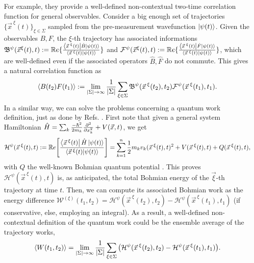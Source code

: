 \documentclass[11pt, a4paper]{article} %
\newcommand{\R}{\mathbb{R}} %
\newcommand{\B}{\mathfrak{B}}
\begin{document}
For example, they provide a well-defined non-contextual two-time correlation function for general observables. Consider a big enough set of trajectories $\{\vec{x}^{\:\xi}(t)\}_{\xi\in \Sigma}$ sampled from the pre-measurement wavefunction $\ket{\psi(t)}$. Given the observables $B,F$, the $\xi$-th trajectory has associated informations $\B^\psi(\vec{x}^\xi(t),t):=\R e\{\frac{\bra{\vec{x}^{\:\xi}(t)}\hat{B}\ket{\psi(t)}}{\bra{\vec{x}^{\:\xi}(t)}\ket{\psi(t)}} \}$ and $\mathcal{F}^\psi(\vec{x}^\xi(t),t):=\R e\{\frac{\bra{\vec{x}^{\:\xi}(t)}\hat{F}\ket{\psi(t)}}{\bra{\vec{x}^{\:\xi}(t)}\ket{\psi(t)}} \}$, which are well-defined even if the associated operators $\hat{B},\hat{F}$ do not commute. This gives a natural correlation function as \vspace{-0.12cm}
\begin{equation}
\langle B(t_2)F(t_1)\rangle := \lim_{|\Sigma|\rightarrow \infty}\frac{1}{|\Sigma|} \sum_{\xi\in\Sigma} \B^\psi(\vec{x}^{\:\xi}(t_2),t_2)\mathcal{F}^\psi(\vec{x}^{\:\xi}(t_1),t_1).\vspace{-0.12cm}
\end{equation}
 In a similar way, we can solve the problems concerning a quantum work definition, just as done by Refs. \cite{work1, work2}. First note that given a general system Hamiltonian $\hat{H}=\sum_k \frac{-\hbar^2}{2m_k}\pdv[2]{}{x_k}+V(\vec{x},t)$, we get\vspace{-0.15cm}
\begin{equation}
\mathcal{H}^\psi(\vec{x}^{\:\xi}(t),t) := \mathbb{R}e\qty[ \frac{\bra{\vec{x}^{\:\xi}(t)}\hat{H}\ket{\psi(t)}}{\bra{\vec{x}^{\:\xi}(t)}\ket{\psi(t)}} ] = \sum_{k=1}^n\frac{1}{2}m_kv_k(\vec{x}^{\:\xi}(t),t)^2+V(\vec{x}^{\:\xi}(t),t)+Q(\vec{x}^{\:\xi}(t),t),\vspace{-0.15cm}
\end{equation}
with $Q$ the well-known Bohmian quantum potential \cite{Holland, Durr, JordiXavier}. This proves $\mathcal{H}^\psi(\vec{x}^{\:\xi}(t),t)$ is, as anticipated, the total Bohmian energy of the $\vec{\xi}$-th trajectory at time $t$. Then, we can compute its associated Bohmian work as the energy difference $\mathcal{W}^{(\xi)}(t_1,t_2)= \mathcal{H}^\psi(\vec{x}^{\:\xi}(t_2),t_2)-\mathcal{H}^\psi(\vec{x}^{\:\xi}(t_1),t_1)$ (if conservative, else, employing an integral). As a result, a well-defined non-contextual definition of the quantum work could be the ensemble average of the trajectory works,\vspace{-0.1cm}
\begin{equation}
\langle W(t_1,t_2)\rangle = \lim_{|\Sigma|\rightarrow \infty}\frac{1}{|\Sigma|} \sum_{\xi\in\Sigma} \qty(\mathcal{H}^\psi(\vec{x}^{\:\xi}(t_2),t_2)-\mathcal{H}^\psi(\vec{x}^{\:\xi}(t_1),t_1)).\vspace{-0.1cm}
\end{equation}
\end{document}
